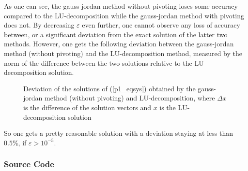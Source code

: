 \documentclass[12pt, a4paper]{article}
\newenvironment{code}{\captionsetup{type=listing}}{}
\begin{document}
  \noindent
  As one can see, the gauss-jordan method without pivoting loses some accuracy compared to the LU-decomposition while the gauss-jordan method with pivoting does not. By decreasing $\varepsilon$ even further, one cannot observe any loss of accuracy between, or a significant deviation from the exact solution of the latter two methods. However, one gets the following deviation between the gauss-jordan method (without pivoting) and the LU-decomposition method, measured by the norm of the difference between the two solutions relative to the LU-decomposition solution.

  \begin{figure}[ht]
    \begin{center}
      
      \caption{Deviation of the solutions of (\ref{p1_eqsys}) obtained by the gauss-jordan method (without pivoting) and LU-decomposition, where $\Delta x$ is the difference of the solution vectors and $x$ is the LU-decomposition solution}
    \end{center}
  \end{figure}

  \newpage\noindent
  So one gets a pretty reasonable solution with a deviation staying at less than $0.5 \%$, if $\varepsilon > 10^{-5}$.

  \subsubsection*{Source Code}
  \begin{code}
    \inputminted{python}{linsolve.py}
  \end{code}
  \begin{code}
    \inputminted{python}{problem1.py}
  \end{code}
\end{document}
